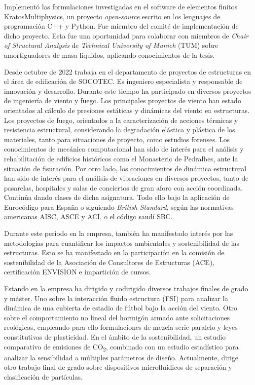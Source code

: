 \documentclass[12pt]{article}
\begin{document}
Implementó las formulaciones investigadas en el software de elementos finitos KratosMultiphysics, un proyecto \emph{open-source} escrito en los lenguajes de programación C++ y Python. Fue miembro del comité de implementación de dicho proyecto. Esta fue una oportunidad para colaborar con miembros de \emph{Chair of Structural Analysis} de \emph{Technical University of Munich} (TUM) sobre amortiguadores de masa líquidos, aplicando conocimientos de la tesis.

Desde octubre de 2022 trabaja en el departamento de proyectos de estructuras en el área de edificación de SOCOTEC. Es ingeniero especialista y responsable de innovación y desarrollo. Durante este tiempo ha participado en diversos proyectos de ingeniería de viento y fuego. Los principales proyectos de viento han estado orientados al cálculo de presiones estáticas y dinámicas del viento en estructuras. Los proyectos de fuego, orientados a la caracterización de acciones térmicas y resistencia estructural, considerando la degradación elástica y plástica de los materiales, tanto para situaciones de proyecto, como estudios forenses. Los conocimientos de mecánica computacional han sido de interés para el análisis y rehabilitación de edificios históricos como el Monasterio de Pedralbes, ante la situación de fisuración. Por otro lado, los conocimientos de dinámica estructural han sido de interés para el análisis de vibraciones en diversos proyectos, tanto de pasarelas, hospitales y salas de conciertos de gran aforo con acción coordinada. Continúa dando clases de dicha asignatura. Todo ello bajo la aplicación de Eurocódigo para España o siguiendo \emph{British Standard}, según las normativas americanas AISC, ASCE y ACI, o el código saudí SBC.

Durante este periodo en la empresa, también ha manifestado interés por las metodologías para cuantificar los impactos ambientales y sostenibilidad de las estructuras. Esto se ha manifestado en la participación en la comisión de sostenibilidad de la Asociación de Consultores de Estructuras (ACE), certificación ENVISION e impartición de cursos.

Estando en la empresa ha dirigido y codirigido diversos trabajos finales de grado y máster. Uno sobre la interacción fluido estructura (FSI) para analizar la dinámica de una cubierta de estadio de fútbol bajo la acción del viento. Otro sobre el comportamiento no lineal del hormigón armado ante solicitaciones reológicas, empleando para ello formulaciones de mezcla serie-paralelo y leyes constitutivas de plasticidad. En el ámbito de la sostenibilidad, un estudio comparativo de emisiones de CO\textsubscript{2}, combinado con un estudio estadístico para analizar la sensibilidad a múltiples parámetros de diseño. Actualmente, dirige otro trabajo final de grado sobre dispositivos microfluídicos de separación y clasificación de partículas.
\end{document}
